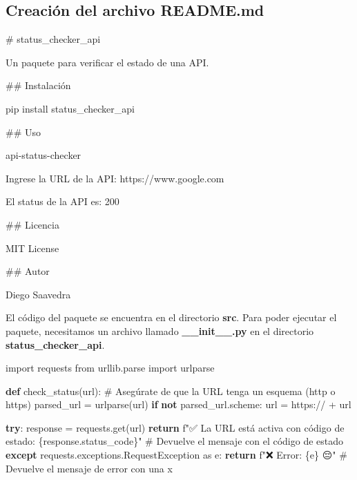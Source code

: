\documentclass[
  a4paper,
  DIV=11,
  numbers=noendperiod,
  onepage,
  openany]{scrreprt}
\newenvironment{Shaded}{\begin{snugshade}}{\end{snugshade}}
\newcommand{\CommentTok}[1]{\textcolor[rgb]{0.37,0.37,0.37}{#1}}
\newcommand{\ControlFlowTok}[1]{\textcolor[rgb]{0.00,0.23,0.31}{\textbf{#1}}}
\newcommand{\FunctionTok}[1]{\textcolor[rgb]{0.28,0.35,0.67}{#1}}
\newcommand{\ImportTok}[1]{\textcolor[rgb]{0.00,0.46,0.62}{#1}}
\newcommand{\KeywordTok}[1]{\textcolor[rgb]{0.00,0.23,0.31}{\textbf{#1}}}
\newcommand{\NormalTok}[1]{\textcolor[rgb]{0.00,0.23,0.31}{#1}}
\newcommand{\OperatorTok}[1]{\textcolor[rgb]{0.37,0.37,0.37}{#1}}
\newcommand{\SpecialCharTok}[1]{\textcolor[rgb]{0.37,0.37,0.37}{#1}}
\newcommand{\SpecialStringTok}[1]{\textcolor[rgb]{0.13,0.47,0.30}{#1}}
\newcommand{\StringTok}[1]{\textcolor[rgb]{0.13,0.47,0.30}{#1}}
\begin{document}
\begin{tcolorbox}
\chapter{Creación del archivo
README.md}\label{creaciuxf3n-del-archivo-readme.md}

\begin{Shaded}
\begin{Highlighting}[]
\FunctionTok{\# status\_checker\_api}

\NormalTok{Un paquete para verificar el estado de una API.}

\FunctionTok{\#\# Instalación}

\NormalTok{pip install status\_checker\_api}

\FunctionTok{\#\# Uso}

\NormalTok{api{-}status{-}checker}

\NormalTok{Ingrese la URL de la API: https://www.google.com}

\NormalTok{El status de la API es: 200}

\FunctionTok{\#\# Licencia}

\NormalTok{MIT License}

\FunctionTok{\#\# Autor}

\NormalTok{Diego Saavedra}
\end{Highlighting}
\end{Shaded}

El código del paquete se encuentra en el directorio \textbf{src}. Para
poder ejecutar el paquete, necesitamos un archivo llamado
\textbf{\_\_init\_\_.py} en el directorio \textbf{status\_checker\_api}.

\begin{Shaded}
\begin{Highlighting}[]
\ImportTok{import}\NormalTok{ requests}
\ImportTok{from}\NormalTok{ urllib.parse }\ImportTok{import}\NormalTok{ urlparse}

\KeywordTok{def}\NormalTok{ check\_status(url):}
    \CommentTok{\# Asegúrate de que la URL tenga un esquema (http o https)}
\NormalTok{    parsed\_url }\OperatorTok{=}\NormalTok{ urlparse(url)}
    \ControlFlowTok{if} \KeywordTok{not}\NormalTok{ parsed\_url.scheme:}
\NormalTok{        url }\OperatorTok{=} \StringTok{\textquotesingle{}https://\textquotesingle{}} \OperatorTok{+}\NormalTok{ url}
    
    \ControlFlowTok{try}\NormalTok{:}
\NormalTok{        response }\OperatorTok{=}\NormalTok{ requests.get(url)}
        \ControlFlowTok{return} \SpecialStringTok{f"✅ La URL está activa con código de estado: }\SpecialCharTok{\{}\NormalTok{response}\SpecialCharTok{.}\NormalTok{status\_code}\SpecialCharTok{\}}\SpecialStringTok{"}  \CommentTok{\# Devuelve el mensaje con el código de estado}
    \ControlFlowTok{except}\NormalTok{ requests.exceptions.RequestException }\ImportTok{as}\NormalTok{ e:}
        \ControlFlowTok{return} \SpecialStringTok{f"❌ Error: }\SpecialCharTok{\{}\NormalTok{e}\SpecialCharTok{\}}\SpecialStringTok{ 😔"}  \CommentTok{\# Devuelve el mensaje de error con una x}
\end{Highlighting}
\end{Shaded}


\end{tcolorbox}
\end{document}
